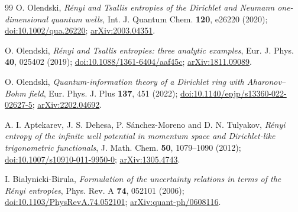\documentclass[11pt,a4paper]{article}
\theoremstyle{definition}
\theoremstyle{plain}
\begin{document}
\clearpage
\begingroup\small
\begin{thebibliography}{99}
\setlength{\itemsep}{2pt}
O. Olendski,
\emph{R\'enyi and Tsallis entropies of the Dirichlet and Neumann
one-dimensional quantum wells},
Int. J. Quantum Chem. \textbf{120}, e26220 (2020);
\href{https://doi.org/10.1002/qua.26220}{doi:10.1002/qua.26220};
\href{https://arxiv.org/abs/2003.04351}{arXiv:2003.04351}.

O. Olendski,
\emph{R\'enyi and Tsallis entropies: three analytic examples},
Eur. J. Phys. \textbf{40}, 025402 (2019);
\href{https://doi.org/10.1088/1361-6404/aaf45c}{doi:10.1088/1361-6404/aaf45c};
\href{https://arxiv.org/abs/1811.09089}{arXiv:1811.09089}.

O. Olendski,
\emph{Quantum-information theory of a Dirichlet ring with Aharonov--Bohm field},
Eur. Phys. J. Plus \textbf{137}, 451 (2022);
\href{https://doi.org/10.1140/epjp/s13360-022-02627-5}{doi:10.1140/epjp/s13360-022-02627-5};
\href{https://arxiv.org/abs/2202.04692}{arXiv:2202.04692}.

A. I. Aptekarev, J. S. Dehesa, P. S\'anchez-Moreno and D. N. Tulyakov,
\emph{R\'enyi entropy of the infinite well potential in momentum space and
Dirichlet-like trigonometric functionals},
J. Math. Chem. \textbf{50}, 1079--1090 (2012);
\href{https://doi.org/10.1007/s10910-011-9950-0}{doi:10.1007/s10910-011-9950-0};
\href{https://arxiv.org/abs/1305.4743}{arXiv:1305.4743}.

I. Bialynicki-Birula,
\emph{Formulation of the uncertainty relations in terms of the R\'enyi
entropies},
Phys. Rev. A \textbf{74}, 052101 (2006);
\href{https://doi.org/10.1103/PhysRevA.74.052101}{doi:10.1103/PhysRevA.74.052101};
\href{https://arxiv.org/abs/quant-ph/0608116}{arXiv:quant-ph/0608116}.
\end{thebibliography}
\endgroup
\end{document}
